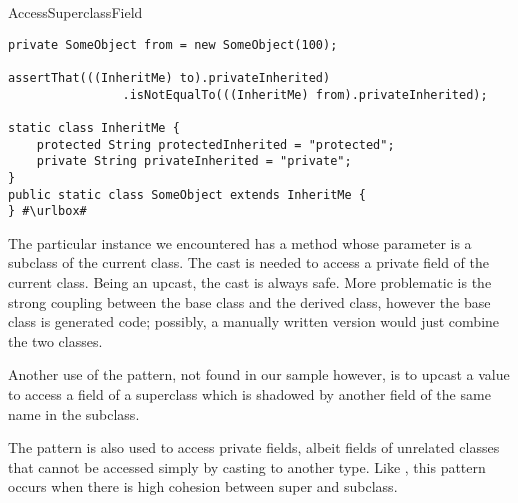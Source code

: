 \begin{pattern}{AccessSuperclassField}
\def\urlvar{http://bit.ly/mockito_mockito_2vF51Em}
\begin{listing}
\begin{verbatim}
private SomeObject from = new SomeObject(100);

assertThat(((InheritMe) to).privateInherited)
				.isNotEqualTo(((InheritMe) from).privateInherited);

static class InheritMe {
	protected String protectedInherited = "protected";
	private String privateInherited = "private";
}
public static class SomeObject extends InheritMe {
} #\urlbox#
\end{verbatim}
\end{listing}


\issues{}
The particular instance we encountered has a method whose parameter is a subclass of the current class.
The cast is needed to access a private field of the current class.
Being an upcast, the cast is always safe.
More problematic is the strong coupling between the base class and the derived class,
however the base class is generated code;
possibly, a manually written version would just combine the two classes.

Another use of the pattern, not found in our sample however,
is to upcast a value to access a field of a superclass which is shadowed by another field of the same name in the subclass.

The  pattern is also used to access private fields,
albeit fields of unrelated classes that cannot be accessed simply by casting to another type.
Like ,
this pattern occurs when there is high cohesion between super and subclass.

\end{pattern}
